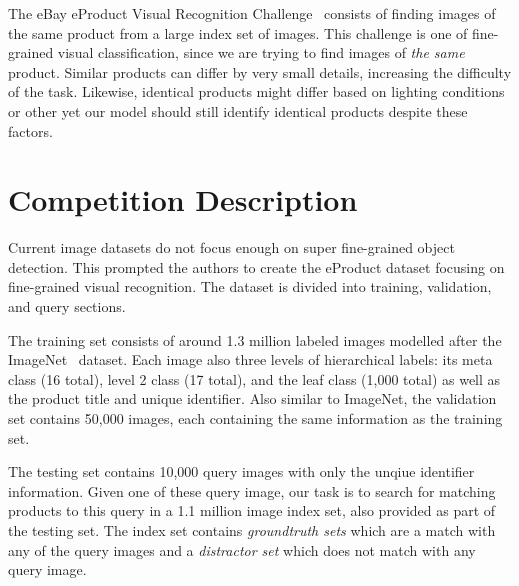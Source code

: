 \documentclass[conference]{IEEEtran}
\begin{document}
The eBay eProduct Visual Recognition Challenge~\cite{jiangbo2021ebay} consists of
finding images of the same product from a large index set of images.
This challenge is one of fine-grained visual classification, since we are trying to 
find images of \emph{the same} product. 
Similar products can differ by very small details, increasing the difficulty of the task.
Likewise, identical products might differ based on lighting conditions or other yet 
our model should still identify identical products despite these factors.

\section{Competition Description}
Current image datasets do not focus enough on super fine-grained object detection.
This prompted the authors to create the eProduct dataset focusing on fine-grained
visual recognition.
The dataset is divided into training, validation, and query sections. 

The training set consists of around 1.3 million labeled images modelled after the ImageNet~\cite{deng2009imagenet} dataset.
Each image also three levels of hierarchical labels: its meta class (16 total), level 2 class (17 total),
and the leaf class (1,000 total) as well as the product title and unique identifier.
Also similar to ImageNet, the validation set contains 50,000 images, each containing the same information 
as the training set.

The testing set contains 10,000 query images with only the unqiue identifier information.
Given one of these query image, our task is to search for matching products to this query in a 1.1 million image index set, also provided
as part of the testing set.
The index set contains \emph{groundtruth sets} which are a match with any of the query images and 
a \emph{distractor set} which does not match with any query image.
\end{document}
